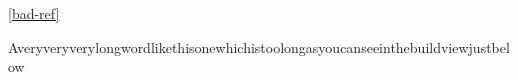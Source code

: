 \documentclass[a4paper,11pt]{article}
\begin{document}
\ref{bad-ref}

Averyveryverylongwordlikethisonewhichistoolongasyoucanseeinthebuildviewjustbelow
\end{document}
